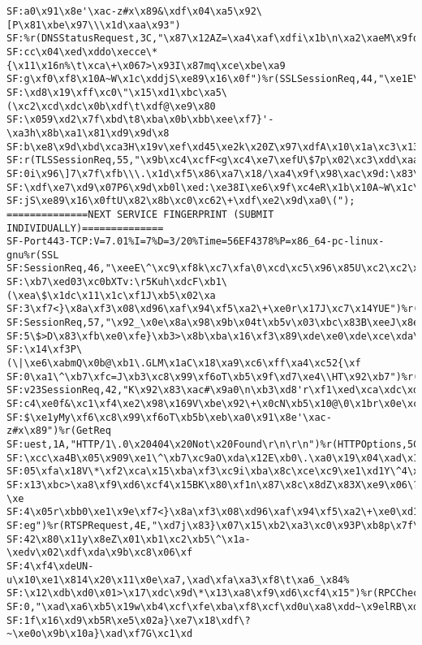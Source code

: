 \documentclass[12pt,a4paper]{report}
\begin{document}
\begin{verbatim}
SF:a0\x91\x8e'\xac-z#x\x89&\xdf\x04\xa5\x92\[P\x81\xbe\x97\\\x1d\xaa\x93")
SF:%r(DNSStatusRequest,3C,"\x87\x12AZ=\xa4\xaf\xdfi\x1b\n\xa2\xaeM\x9fd@\x
SF:cc\x04\xed\xddo\xecce\*{\x11\x16n%\t\xca\+\x067>\x93I\x87mq\xce\xbe\xa9
SF:g\xf0\xf8\x10A~W\x1c\xddjS\xe89\x16\x0f")%r(SSLSessionReq,44,"\xe1E\x95
SF:\xd8\x19\xff\xc0\"\x15\xd1\xbc\xa5\(\xc2\xcd\xdc\x0b\xdf\t\xdf@\xe9\x80
SF:\x059\xd2\x7f\xbd\t8\xba\x0b\xbb\xee\xf7}'-\xa3h\x8b\xa1\x81\xd9\x9d\x8
SF:b\xe8\x9d\xbd\xca3H\x19v\xef\xd45\xe2k\x20Z\x97\xdfA\x10\x1a\xc3\x13")%
SF:r(TLSSessionReq,55,"\x9b\xc4\xcfF<g\xc4\xe7\xefU\$7p\x02\xc3\xdd\xaa\xe
SF:0i\x96\]7\x7f\xfb\\\.\x1d\xf5\x86\xa7\x18/\xa4\x9f\x98\xac\x9d:\x83\x84
SF:\xdf\xe7\xd9\x07P6\x9d\xb0l\xed:\xe38I\xe6\x9f\xc4eR\x1b\x10A~W\x1c\xdd
SF:jS\xe89\x16\x0ftU\x82\x8b\xc0\xc62\+\xdf\xe2\x9d\xa0\(");
==============NEXT SERVICE FINGERPRINT (SUBMIT INDIVIDUALLY)==============
SF-Port443-TCP:V=7.01%I=7%D=3/20%Time=56EF4378%P=x86_64-pc-linux-gnu%r(SSL
SF:SessionReq,46,"\xeeE\^\xc9\xf8k\xc7\xfa\0\xcd\xc5\x96\x85U\xc2\xc2\x88`
SF:\xb7\xed03\xc0bXTv:\r5Kuh\xdcF\xb1\(\xea\$\x1dc\x11\x1c\xf1J\xb5\x02\xa
SF:3\xf7<}\x8a\xf3\x08\xd96\xaf\x94\xf5\xa2\+\xe0r\x17J\xc7\x14YUE")%r(TLS
SF:SessionReq,57,"\x92_\x0e\x8a\x98\x9b\x04t\xb5v\x03\xbc\x83B\xeeJ\x8e\xa
SF:5\$>D\x83\xfb\xe0\xfe}\xb3>\x8b\xba\x16\xf3\x89\xde\xe0\xde\xce\xda\xdb
SF:\x14\xf3P\(\|\xe6\xabmQ\x0b@\xb1\.GLM\x1aC\x18\xa9\xc6\xff\xa4\xc52{\xf
SF:0\xa1\^\xb7\xfc=J\xb3\xc8\x99\xf6oT\xb5\x9f\xd7\xe4\\HT\x92\xb7")%r(SSL
SF:v23SessionReq,42,"K\x92\x83\xac#\x9a0\n\xb3\xd8'r\xf1\xed\xca\xdc\xd4\x
SF:c4\xe0f&\xc1\xf4\xe2\x98\x169V\xbe\x92\+\x0cN\xb5\x10@\0\x1br\x0e\xcdB\
SF:$\xe1yMy\xf6\xc8\x99\xf6oT\xb5b\xeb\xa0\x91\x8e'\xac-z#x\x89")%r(GetReq
SF:uest,1A,"HTTP/1\.0\x20404\x20Not\x20Found\r\n\r\n")%r(HTTPOptions,5C,"/
SF:\xcc\xa4B\x05\x909\xe1\^\xb7\xc9aO\xda\x12E\xb0\.\xa0\x19\x04\xad\x1d\x
SF:05\xfa\x18V\*\xf2\xca\x15\xba\xf3\xc9i\xba\x8c\xce\xc9\xe1\xd1Y\^4\x81\
SF:x13\xbc>\xa8\xf9\xd6\xcf4\x15BK\x80\xf1n\x87\x8c\x8dZ\x83X\xe9\x06\?\xe
SF:4\x05r\xbb0\xe1\x9e\xf7<}\x8a\xf3\x08\xd96\xaf\x94\xf5\xa2\+\xe0\xd1\xc
SF:eg")%r(RTSPRequest,4E,"\xd7j\x83}\x07\x15\xb2\xa3\xc0\x93P\xb8p\x7f\xb2
SF:42\x80\x11y\x8eZ\x01\xb1\xc2\xb5\^\x1a-\xedv\x02\xdf\xda\x9b\xc8\x06\xf
SF:4\xf4\xdeUN-u\x10\xe1\x814\x20\x11\x0e\xa7,\xad\xfa\xa3\xf8\t\xa6_\x84%
SF:\x12\xdb\xd0\x01>\x17\xdc\x9d\*\x13\xa8\xf9\xd6\xcf4\x15")%r(RPCCheck,3
SF:0,"\xad\xa6\xb5\x19w\xb4\xcf\xfe\xba\xf8\xcf\xd0u\xa8\xdd~\x9elRB\xdd\x
SF:1f\x16\xd9\xb5R\xe5\x02a}\xe7\x18\xdf\?~\xe0o\x9b\x10a}\xad\xf7G\xc1\xd

\end{verbatim}
\end{document}
